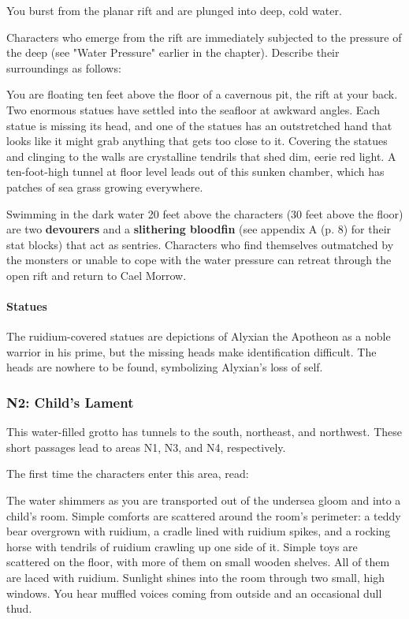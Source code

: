 \documentclass[a4paper, 11pt, bg=full, twocolumn, nooutline]{dndbook}
\begin{document}
\begin{DndReadAloud}
You burst from the planar rift and are plunged into deep, cold water.
\end{DndReadAloud}

Characters who emerge from the rift are immediately subjected to the pressure of the deep (see "Water Pressure" earlier in the chapter). Describe their surroundings as follows:

\begin{DndReadAloud}
You are floating ten feet above the floor of a cavernous pit, the rift at your back. Two enormous statues have settled into the seafloor at awkward angles. Each statue is missing its head, and one of the statues has an outstretched hand that looks like it might grab anything that gets too close to it. Covering the statues and clinging to the walls are crystalline tendrils that shed dim, eerie red light. A ten-foot-high tunnel at floor level leads out of this sunken chamber, which has patches of sea grass growing everywhere.
\end{DndReadAloud}

Swimming in the dark water 20 feet above the characters (30 feet above the floor) are two \textbf{devourers} and a \textbf{slithering bloodfin} (see appendix A (p. 8) for their stat blocks) that act as sentries. Characters who find themselves outmatched by the monsters or unable to cope with the water pressure can retreat through the open rift and return to Cael Morrow.

\paragraph{Statues}

The ruidium-covered statues are depictions of Alyxian the Apotheon as a noble warrior in his prime, but the missing heads make identification difficult. The heads are nowhere to be found, symbolizing Alyxian's loss of self.

\subsubsection{N2: Child's Lament}

This water-filled grotto has tunnels to the south, northeast, and northwest. These short passages lead to areas N1, N3, and N4, respectively.

The first time the characters enter this area, read:

\begin{DndReadAloud}
The water shimmers as you are transported out of the undersea gloom and into a child's room. Simple comforts are scattered around the room's perimeter: a teddy bear overgrown with ruidium, a cradle lined with ruidium spikes, and a rocking horse with tendrils of ruidium crawling up one side of it. Simple toys are scattered on the floor, with more of them on small wooden shelves. All of them are laced with ruidium.
Sunlight shines into the room through two small, high windows. You hear muffled voices coming from outside and an occasional dull thud.
\end{DndReadAloud}
\end{document}

